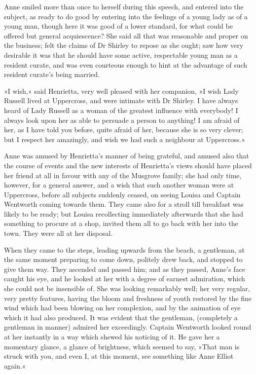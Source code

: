 Anne smiled more than once to herself during this speech, and entered into the subject, as ready to do good by entering into the feelings of a young lady as of a young man, though here it was good of a lower standard, for what could be offered but general acquiescence? She said all that was reasonable and proper on the business; felt the claims of Dr Shirley to repose as she ought; saw how very desirable it was that he should have some active, respectable young man as a resident curate, and was even courteous enough to hint at the advantage of such resident curate's being married.

»I wish,« said Henrietta, very well pleased with her companion, »I wish Lady Russell lived at Uppercross, and were intimate with Dr Shirley. I have always heard of Lady Russell as a woman of the greatest influence with everybody! I always look upon her as able to persuade a person to anything! I am afraid of her, as I have told you before, quite afraid of her, because she is so very clever; but I respect her amazingly, and wish we had such a neighbour at Uppercross.«

Anne was amused by Henrietta's manner of being grateful, and amused also that the course of events and the new interests of Henrietta's views should have placed her friend at all in favour with any of the Musgrove family; she had only time, however, for a general answer, and a wish that such another woman were at Uppercross, before all subjects suddenly ceased, on seeing Louisa and Captain Wentworth coming towards them. They came also for a stroll till breakfast was likely to be ready; but Louisa recollecting immediately afterwards that she had something to procure at a shop, invited them all to go back with her into the town. They were all at her disposal.

When they came to the steps, leading upwards from the beach, a gentleman, at the same moment preparing to come down, politely drew back, and stopped to give them way. They ascended and passed him; and as they passed, Anne's face caught his eye, and he looked at her with a degree of earnest admiration, which she could not be insensible of. She was looking remarkably well; her very regular, very pretty features, having the bloom and freshness of youth restored by the fine wind which had been blowing on her complexion, and by the animation of eye which it had also produced. It was evident that the gentleman, (completely a gentleman in manner) admired her exceedingly. Captain Wentworth looked round at her instantly in a way which shewed his noticing of it. He gave her a momentary glance, a glance of brightness, which seemed to say, »That man is struck with you, and even I, at this moment, see something like Anne Elliot again.«

